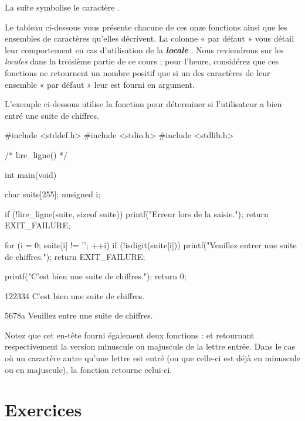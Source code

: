 \begin{infobox}
La suite  symbolise 
le caractère \mybox{\textbar{}}.
\end{infobox}

Le tableau ci-dessous vous présente chacune de ces onze fonctions ainsi
que les ensembles de caractères qu'elles décrivent. La colonne « par
défaut » vous détail leur comportement en cas d'utilisation de la
\textbf{\emph{locale}} . Nous reviendrons sur les
\emph{locales} dans la troisième partie de ce cours ; pour l'heure,
considérez que ces fonctions ne retournent un nombre positif que si un
des caractères de leur ensemble « par défaut » leur est fourni en
argument.

L'exemple ci-dessous utilise la fonction  pour
déterminer si l'utilisateur a bien entré une suite de chiffres.

\begin{C}
#include <stddef.h>
#include <stdio.h>
#include <stdlib.h>

/* lire_ligne() */


int main(void)
{
    char suite[255];
    unsigned i;

    if (!lire_ligne(suite, sizeof suite))
    {
        printf("Erreur lors de la saisie.\n");
        return EXIT_FAILURE;
    }

    for (i = 0; suite[i] != '\0'; ++i)
        if (!isdigit(suite[i]))
        {
            printf("Veuillez entrer une suite de chiffres.\n");
            return EXIT_FAILURE;
        }

    printf("C'est bien une suite de chiffres.\n");
    return 0;
}

\end{C}

\begin{C}
122334
C'est bien une suite de chiffres.

5678a
Veuillez entre une suite de chiffres.
\end{C}

\begin{infobox}
Notez que cet en-tête fourni également deux fonctions : 
et  retournant respectivement la version minuscule ou
majuscule de la lettre entrée. Dans le cas où un caractère autre qu'une
lettre est entré (ou que celle-ci est déjà en minuscule ou en majuscule),
la fonction retourne celui-ci.
\end{infobox}

\section{Exercices }
\label{exercices-5}

